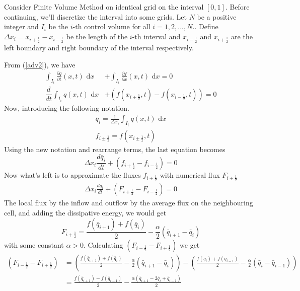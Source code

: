 \documentclass{article}
\newcommand{\dx}{\text{ d}x}
\newcommand{\half}{\frac{1}{2}}
\theoremstyle{definition}
\begin{document}
    Consider Finite Volume Method on identical grid on the interval $[0,1]$. 
    Before continuing, we'll discretize the interval into some grids. 
    Let $N$ be a positive integer and $I_i$ be the $i$-th control volume for all $i=1,2,...,N.$.
    Define $\Delta x_i = x_{i+\half} - x_{i-\half}$ be the length of the $i$-th interval 
    and $x_{i-\frac12}$ and $x_{i+\frac12}$ are the left boundary and right boundary
    of the interval respectively. 

    From (\ref{adv2}),
    we have 
    \begin{align}
        \int_{I_i} \frac{\partial q}{\partial t}(x,t)\text{ d}x 
            &+  \int_{I_i} \frac{\partial f}{\partial x}(x,t)\text{ d}x = 0\\ 
        \dfrac{d}{dt}\int_{I_i} q(x,t) \text{ d}x
            &+ \left( f(x_{i+\frac12},t) - f(x_{i-\frac12},t) \right)= 0
    \end{align}
    Now, introducing the following notation.
    \begin{align}
        \bar{{q}}_i = \frac{1}{\Delta x_i}\int_{I_i} q(x,t) \dx \\
        f_{i \pm \frac12} = f(x_{i\pm \frac12},t)
    \end{align}
    Using the new notation and rearrange terms, the last equation becomes
    \begin{equation}\label{sd1}
        {\Delta x_i}\frac{d\bar{{q}}_i}{dt} + \left( f_{i+\frac12} - f_{i-\frac12}  \right) = 0
    \end{equation}
    Now what's left is to approximate the fluxes $f_{i \pm \frac12}$ with numerical flux $F_{i \pm \frac12}$
    \begin{align}\label{sd2}
        {\Delta x_i}\frac{d\bar{{q}}_i}{dt} + \left( F_{i+\frac12} - F_{i-\frac12}  \right) = 0
    \end{align}
    The local flux by the inflow and outflow by the average flux on the neighbouring cell, %
    and adding the dissipative energy, we would get 
    \begin{equation}\label{approx1}
        F_{i+\frac{1}{2}} = \frac{f(\bar{{q}}_{i+1}) + f(\bar{{q}}_i)}{2} 
        - \frac{\alpha}2\left(\bar{{q}}_{i+1}  - \bar{{q}}_i\right)
    \end{equation} 
    with some constant $\alpha >0$. 
    Calculating $\left( F_{i-\frac12} - F_{i+\frac12}  \right)$ we get
    \begin{align}
        \left( F_{i-\frac12} - F_{i+\frac12}  \right) 
                &= \left(\frac{f(\bar{{q}}_{i+1}) + f(\bar{{q}}_i)}{2} 
                - \frac{\alpha}2\left(\bar{{q}}_{i+1}  - \bar{{q}}_i\right) \right) 
                 - \left( \frac{f(\bar{{q}}_{i}) + f(\bar{{q}}_{i-1})}{2} 
                 - \frac{\alpha}2\left(\bar{{q}}_{i}  - \bar{{q}}_{i-1}\right) \right) \\
                &= \frac{f(\bar{{q}}_{i+1})- f(\bar{{q}}_{i-1})}{2} 
                - \frac{\alpha \left(\bar{{q}}_{i+1} - 2\bar{{q}}_i + \bar{{q}}_{i-1}\right)}2
    \end{align}
\end{document}
